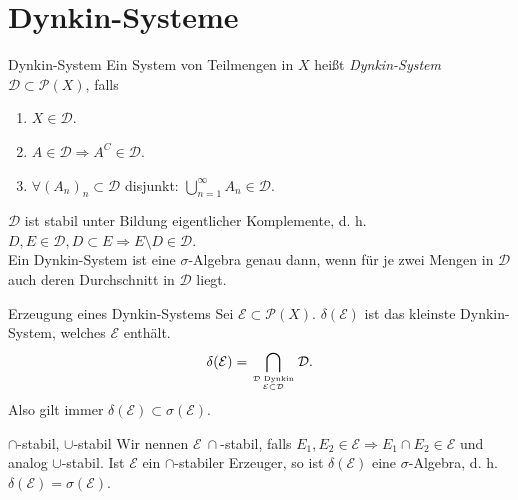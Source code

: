 \section*{Dynkin-Systeme}

\begin{karte}{Dynkin-System}
	Ein System von Teilmengen in \(X\) heißt 
	\textit{Dynkin-System} \(\mathcal{D} \subset \mathcal{P}(X)\), falls 
	\begin{enumerate}
		\item \(X \in \mathcal{D}\).
		\item \( A \in \mathcal{D} \Rightarrow A^C \in \mathcal{D} \).
		\item \( \forall (A_n)_n \subset \mathcal{D} \) disjunkt: \( \bigcup_{n=1}^\infty A_n \in \mathcal{D} \).
	\end{enumerate}
	\( \mathcal{D} \) ist stabil unter Bildung eigentlicher Komplemente, d. h. \( D,E \in \mathcal{D}, D \subset E \Rightarrow E \setminus D \in \mathcal{D} \).\\
	Ein Dynkin-System ist eine \(\sigma\)-Algebra genau 
	dann, wenn für je zwei Mengen in \(\mathcal{D}\) auch 
	deren Durchschnitt in \( \mathcal{D} \) liegt.
\end{karte}

\begin{karte}{Erzeugung eines Dynkin-Systems}
	Sei \( \mathcal{E} \subset \mathcal{P}(X) \). \(\delta(\mathcal{E})\) ist das kleinste Dynkin-System, 
	welches \( \mathcal{E} \) enthält. 
	\[ \delta(\mathcal{E}) = \bigcap_{\mathcal{D} \text{ Dynkin} \atop \mathcal{E} \subset \mathcal{D} } \mathcal{D}.  \]
	Also gilt immer \( \delta(\mathcal{E}) \subset \sigma(\mathcal{E}) \). 
\end{karte}

\begin{karte}{\( \cap\)-stabil, \(\cup\)-stabil}
	Wir nennen \( \mathcal{E}\ \cap \)-stabil, falls 
	\( E_1, E_2 \in \mathcal{E} \Rightarrow E_1 \cap E_2 \in \mathcal{E} \) und analog \(\cup\)-stabil.
	Ist \( \mathcal{E} \) ein \(\cap\)-stabiler Erzeuger, so ist \(\delta(\mathcal{E})\) eine \( \sigma \)-Algebra, 
	d. h. \( \delta(\mathcal{E}) = \sigma(\mathcal{E}) \).
\end{karte}